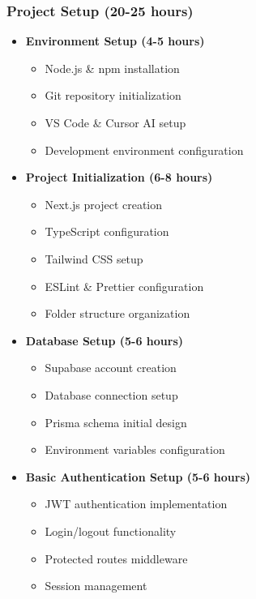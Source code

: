 \documentclass[11pt,a4paper]{article}
\begin{document}
\subsubsection{Project Setup (20-25 hours)}
\begin{itemize}
    \item \textbf{Environment Setup (4-5 hours)}
    \begin{itemize}
        \item Node.js \& npm installation
        \item Git repository initialization
        \item VS Code \& Cursor AI setup
        \item Development environment configuration
    \end{itemize}
    
    \item \textbf{Project Initialization (6-8 hours)}
    \begin{itemize}
        \item Next.js project creation
        \item TypeScript configuration
        \item Tailwind CSS setup
        \item ESLint \& Prettier configuration
        \item Folder structure organization
    \end{itemize}
    
    \item \textbf{Database Setup (5-6 hours)}
    \begin{itemize}
        \item Supabase account creation
        \item Database connection setup
        \item Prisma schema initial design
        \item Environment variables configuration
    \end{itemize}
    
    \item \textbf{Basic Authentication Setup (5-6 hours)}
    \begin{itemize}
        \item JWT authentication implementation
        \item Login/logout functionality
        \item Protected routes middleware
        \item Session management
    \end{itemize}
\end{itemize}
\end{document}

